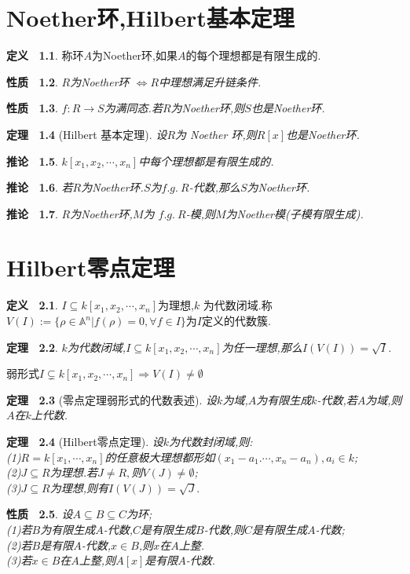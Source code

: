 \documentclass[b5paper,oneside]{ctexbook}
\theoremstyle{plain}
\newtheorem{thm}{定理~}[chapter]
\newtheorem{prop}[thm]{性质~}
\newtheorem{cor}[thm]{推论~}
\theoremstyle{definition}
\newtheorem{defn}[thm]{定义~}
\begin{document}
\pagestyle{plain}
\chapter{Noether环,Hilbert基本定理}
\begin{defn}称环$A$为Noether环,如果$A$的每个理想都是有限生成的.
\end{defn}
\begin{prop} 
$R$为Noether环 $\Leftrightarrow R$中理想满足升链条件.
\end{prop} 
\begin{prop} 
$f:R\to S$为满同态.若$R$为Noether环,则$S$也是Noether环.
\end{prop}  
\begin{thm}[Hilbert 基本定理]
设$R$为 Noether 环,则$R[x]$也是Noether环.
\end{thm} 
\begin{cor}
$k[x_1,x_2, \cdots, x_n]$中每个理想都是有限生成的.
\end{cor}
\begin{cor} 
若$R$为Noether环.$S$为$f.g.~R$-代数,那么$S$为Noether环.
\end{cor} 
\begin{cor} 
$R$为Noether环,$M$为 $f.g.~R$-模,则$M$为Noether模(子模有限生成).
\end{cor}
\chapter{Hilbert零点定理} 
\begin{defn} 
$I\subseteq k[x_1,x_2,\cdots,x_n]$为理想,$k$ 为代数闭域.称$V(I):=\{\rho \in \mathbb{A}^n|f(\rho)= 0, \forall f \in I\}$为$I$定义的代数簇.
\end{defn} 
\begin{thm} 
$k$为代数闭域,$I\subseteq k[x_1,x_2,\cdots,x_n]$为任一理想,那么$I(V(I))=\sqrt{I}$.
\end{thm} 
弱形式$I\subsetneq k[x_1,x_2,\cdots,x_n]\Rightarrow V(I)\neq \emptyset$
\begin{thm}[零点定理弱形式的代数表述]设$k$为域,$A$为有限生成$k$-代数,若$A$为域,则$A$在$k$上代数.
\end{thm}
\begin{thm}[Hilbert零点定理]
设$k$为代数封闭域,则:\\
(1)$R=k[x_1,\cdots,x_n]$的任意极大理想都形如$(x_1-a_1.\cdots,x_n-a_n),a_i\in k$;\\
(2)$J\subseteq R$为理想.若$J\neq R,$则$V(J)\neq\emptyset$;\\
(3)$J\subseteq R$为理想,则有$I(V(J))=\sqrt{J}.$
\end{thm}
\begin{prop}
设$A\subseteq B\subseteq C$为环;\\
(1)若$B$为有限生成$A$-代数,$C$是有限生成$B$-代数,则$C$是有限生成$A$-代数;\\
(2)若$B$是有限$A$-代数,$x\in B$,则$x$在$A$上整.\\
(3)若$x\in B$在$A$上整,则$A[x]$是有限$A$-代数.
\end{prop}
\end{document}
